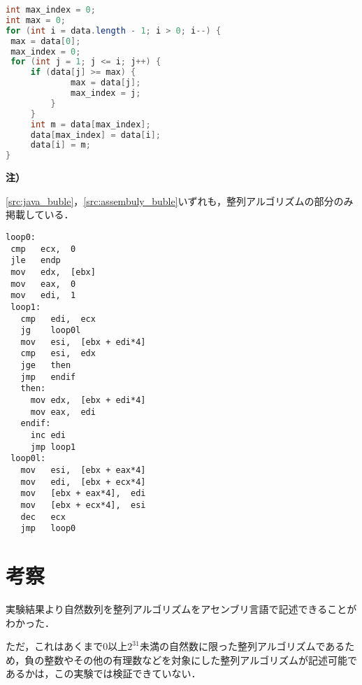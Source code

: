 \begin{minipage}[t]{0.5\linewidth}
   \centering
   \begin{lstlisting}[caption={{\ttfamily Java}で記述した選択ソート}, label={src:java_buble}, language={Java},frame={left}]
int max_index = 0;
int max = 0;
for (int i = data.length - 1; i > 0; i--) {
 max = data[0];
 max_index = 0;
 for (int j = 1; j <= i; j++) {
     if (data[j] >= max) {
             max = data[j];
             max_index = j;
         }
     }
     int m = data[max_index];
     data[max_index] = data[i];
     data[i] = m;
}
   \end{lstlisting}
   \begin{flushleft}
       \begin{framed}
           \noindent\textbf{注）}\par
           \ref{src:java_buble}，\ref{src:assembuly_buble}いずれも，整列アルゴリズムの部分のみ掲載している．
       \end{framed}
   \end{flushleft}
\end{minipage}
\hspace{3em}
\begin{minipage}[t]{0.4\linewidth}
   \begin{lstlisting}[frame={left},caption={アセンブリ言語で記述した選択ソート},label={src:assembuly_buble}]
loop0:
 cmp   ecx,  0
 jle   endp
 mov   edx,  [ebx]
 mov   eax,  0    
 mov   edi,  1
 loop1:
   cmp   edi,  ecx
   jg    loop0l
   mov   esi,  [ebx + edi*4]
   cmp   esi,  edx
   jge   then
   jmp   endif
   then:
     mov edx,  [ebx + edi*4]
     mov eax,  edi          
   endif:
     inc edi
     jmp loop1
 loop0l:
   mov   esi,  [ebx + eax*4]
   mov   edi,  [ebx + ecx*4]
   mov   [ebx + eax*4],  edi
   mov   [ebx + ecx*4],  esi
   dec   ecx
   jmp   loop0
\end{lstlisting}
\end{minipage}
\section{考察}
実験結果より自然数列を整列アルゴリズムをアセンブリ言語で記述できることがわかった．\par
ただ，これはあくまで\(0\)以上\(2^{31}\)未満の自然数に限った整列アルゴリズムであるため，負の整数やその他の有理数などを対象にした整列アルゴリズムが記述可能であるかは，この実験では検証できていない．
